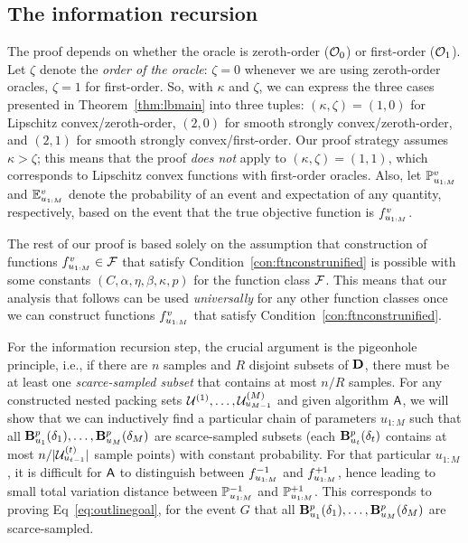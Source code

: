 \subsection{The information recursion}
\label{sec:proof-lbmain-inforec}

The proof depends on whether the oracle is zeroth-order ($\mathcal{O}_0$) or first-order ($\mathcal{O}_1$).
Let $\zeta$ denote the \emph{order of the oracle}: $\zeta = 0$ whenever we are using zeroth-order oracles, 
$\zeta = 1$ for first-order.
So, with $\kappa$ and $\zeta$, we can express the three cases presented in Theorem~\ref{thm:lbmain} into three tuples: $(\kappa, \zeta) = (1,0)$ for Lipschitz convex/zeroth-order, $(2,0)$ for smooth strongly convex/zeroth-order, and $(2,1)$ for smooth strongly convex/first-order.
Our proof strategy assumes $\kappa > \zeta$;
this means that the proof \emph{does not} apply to $(\kappa,\zeta) = (1,1)$, which corresponds to 
Lipschitz convex functions with first-order oracles.
Also, let $\mathbb{P}_{u_{1:M}}^v$ and $\mathbb{E}_{u_{1:M}}^v$ denote the probability of an event and expectation of any quantity, respectively, based on the event that the true objective function is $f_{u_{1:M}}^v$.

The rest of our proof is based solely on the assumption that construction of functions $f_{u_{1:M}}^v \in \mathcal{F}$ that satisfy Condition~\ref{con:ftnconstrunified} is possible with some constants $(C, \alpha, \eta, \beta, \kappa, p)$ for the function class $\mathcal{F}$. 
This means that our analysis that follows can be used \emph{universally} for any other function classes once we can construct functions $f_{u_{1:M}}^v$ that satisfy Condition~\ref{con:ftnconstrunified}.

For the information recursion step, the crucial argument is the pigeonhole principle, i.e., if there are $n$ samples and $R$ disjoint subsets of $\mathbf{D}$, there must be at least one \emph{scarce-sampled subset} that contains at most $n/R$ samples.
For any constructed nested packing sets $\mathcal{U}^{(1)}, \dots, \mathcal{U}^{({M})}_{u_{M-1}}$ and given algorithm $\mathsf{A}$, we will show that we can inductively find a particular chain of parameters $u_{1:M}$ such that all $\mathbf{B}^p_{u_{1}}({\delta_{1}}), \dots, \mathbf{B}^p_{u_{M}}({\delta_{M}})$ are scarce-sampled subsets (each $\mathbf{B}^p_{u_{t}}({\delta_{t}})$ contains at most $n/|\mathcal{U}^{({t})}_{u_{t-1}}|$ sample points) with constant probability.
For that particular $u_{1:M}$, it is difficult for $\mathsf{A}$ to distinguish between $f_{u_{1:M}}^{-1}$ and $f_{u_{1:M}}^{+1}$, hence leading to small total variation distance between $\mathbb{P}_{u_{1:M}}^{-1}$ and $\mathbb{P}_{u_{1:M}}^{+1}$. This corresponds to proving Eq~\eqref{eq:outlinegoal}, for the event $G$ that all $\mathbf{B}^p_{u_{1}}({\delta_{1}}), \dots, \mathbf{B}^p_{u_{M}}({\delta_{M}})$ are scarce-sampled.

